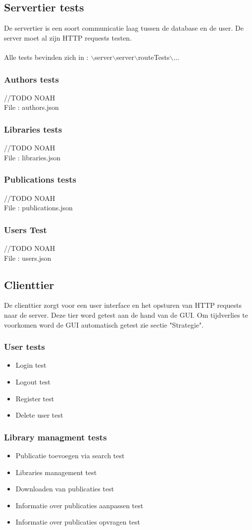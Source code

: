 \documentclass{article}
\begin{document}
\subsection{Servertier tests}
De servertier is een soort communicatie laag tussen de database en de user. De server moet al zijn HTTP requests testen.
\\\\
Alle tests bevinden zich in : $\backslash$server$\backslash$server$\backslash$routeTests$\backslash$...
\subsubsection{Authors tests}
//TODO NOAH\\
File : authors.json
\subsubsection{Libraries tests}
//TODO NOAH\\
File : libraries.json
\subsubsection{Publications tests}
//TODO NOAH\\
File : publications.json
\subsubsection{Users Test}
//TODO NOAH\\
File : users.json
\subsection{Clienttier}
De clienttier zorgt voor een user interface en het opsturen van HTTP requests naar de server. Deze tier word getest aan de hand van de GUI. Om tijdverlies te voorkomen word de GUI automatisch getest zie sectie "Strategie".
\subsubsection{User tests}
\begin{itemize}
  \item Login test
  \item Logout test 
  \item Register test
  \item Delete user test
\end{itemize}
\subsubsection{Library managment tests}
\begin{itemize}
  \item Publicatie toevoegen via search test
  \item Libraries management test
  \item Downloaden van publicaties test
  \item Informatie over publicaties aanpassen test
  \item Informatie over publicaties opvragen test
\end{itemize}
\end{document}
